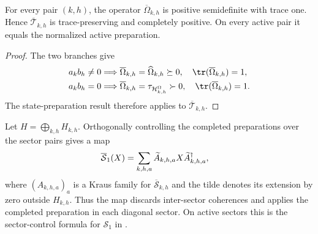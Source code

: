 \begin{lemma}
    \label{thm:mpdo_completed_omega_preparation_cptp}
    \leanok
    For every pair $(k,h)$, the operator $\overline\Omega_{k,h}$ is positive
    semidefinite with trace one. Hence $\overline{\mathcal T}_{k,h}$ is
    trace-preserving and completely positive. On every active pair it equals
    the normalized active preparation.
\end{lemma}
\begin{proof}
    \leanok
    The two branches give
    \begin{align}
        a_kb_h\ne0
         & \Longrightarrow
        \overline\Omega_{k,h}=\widehat\Omega_{k,h}\succeq0,
        \quad \tr(\overline\Omega_{k,h})=1, \notag \\
        a_kb_h=0
         & \Longrightarrow
        \overline\Omega_{k,h}=\tau_{\mathcal H^{\Omega}_{k,h}}\succ0,
        \quad \tr(\overline\Omega_{k,h})=1. \notag
    \end{align}
    The state-preparation result therefore applies to
    $\overline{\mathcal T}_{k,h}$.
\end{proof}

\begin{definition}
    \label{def:mpdo_completed_eta_controlled_map}
    \leanok
    Let $H=\bigoplus_{k,h}H_{k,h}$. Orthogonally controlling the completed
    preparations over the sector pairs gives a map
    \begin{align}
        \overline{\mathcal S}_1(X)
         & =\sum_{k,h,a}\widetilde A_{k,h,a}X
        \widetilde A_{k,h,a}^{\dagger}, \notag
    \end{align}
    where $(A_{k,h,a})_a$ is a Kraus family for
    $\overline{\mathcal S}_{k,h}$ and the tilde denotes its extension by zero
    outside $H_{k,h}$. Thus the map discards inter-sector coherences and
    applies the completed preparation in each diagonal sector. On active
    sectors this is the sector-control formula for $\mathcal S_1$ in
    \cite[Appendix~C.2, lines~1548--1555]{Cirac2016MPDO_arXiv}.
\end{definition}

